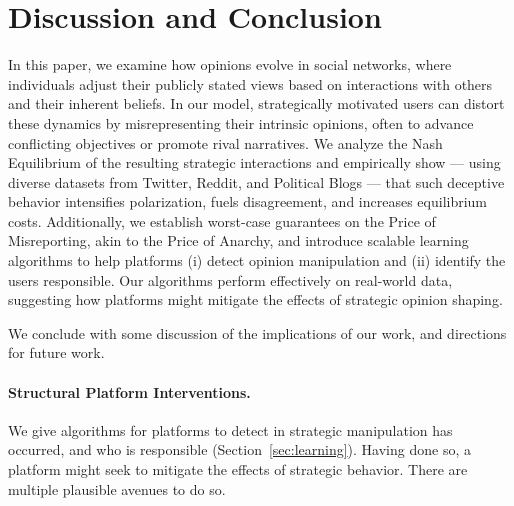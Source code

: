 \section{Discussion and Conclusion}

In this paper, we examine how opinions evolve in social networks, where individuals adjust their publicly stated views based on interactions with others and their inherent beliefs. In our model, strategically motivated users can distort these dynamics by misrepresenting their intrinsic opinions, often to advance conflicting objectives or promote rival narratives. We analyze the Nash Equilibrium of the resulting strategic interactions and empirically show --- using diverse datasets from Twitter, Reddit, and Political Blogs --- that such deceptive behavior intensifies polarization, fuels disagreement, and increases equilibrium costs. Additionally, we establish worst-case guarantees on the Price of Misreporting, akin to the Price of Anarchy, and introduce scalable learning algorithms to help platforms (i) detect opinion manipulation and (ii) identify the users responsible. Our algorithms perform effectively on real-world data, suggesting how platforms might mitigate the effects of strategic opinion shaping.

\smallskip

\noindent We conclude with some discussion of the implications of our work, and directions for future work. 


\paragraph{Structural Platform Interventions.}


We give algorithms for platforms to detect in strategic manipulation has occurred, and who is responsible (Section~\ref{sec:learning}). Having done so, a platform might seek to mitigate the effects of strategic behavior. There are multiple plausible avenues to do so. 

